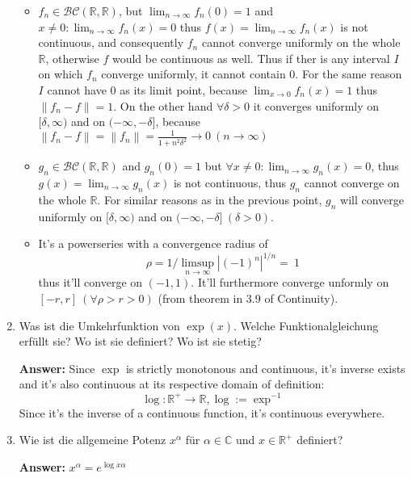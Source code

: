\documentclass[11pt]{article}
\newcommand{\norm}[1]{\left\lVert#1\right\rVert}
\newcommand{\abs}[1]{\left|#1\right|}
\begin{document}
\begin{enumerate}
\begin{itemize}
    \item $f_n \in \mathcal{BC}(\mathbb{R},\mathbb{R})$, but $\lim_{n\to\infty}f_n(0) = 1$ and $x\neq0\colon \lim_{n\to\infty}f_n(x) = 0$ thus $f(x) = \lim_{n\to\infty}f_n(x)$ is not continuous, and consequently $f_n$ cannot converge uniformly on the whole $\mathbb{R}$, otherwise $f$ would be continuous as well. Thus if ther is any interval $I$ on which $f_n$ converge uniformly, it cannot contain $0$. For the same reason $I$ cannot have $0$ as its limit point, because $\lim_{x\to0}f_n(x) = 1$ thus $\norm{f_n - f} = 1$. On the other hand $\forall \delta > 0$ it converges uniformly on  $[\delta, \infty)$ and on $(-\infty, -\delta]$, because $\norm{f_n - f} = \norm{f_n} = \frac{1}{1+n^2\delta^2} \to 0~(n\to\infty)$
    \item $g_n \in \mathcal{BC}(\mathbb{R},\mathbb{R})$ and $g_n(0) = 1$ but $\forall x\neq0\colon \lim_{n\to\infty}g_n(x) = 0$, thus $g(x) = \lim_{n\to\infty}g_n(x)$ is not continuous, thus $g_n$ cannot converge on the whole $\mathbb{R}$. For similar reasons as in the previous point, $g_n$ will converge uniformly on  $[\delta, \infty)$ and on $(-\infty, -\delta]~(\delta > 0)$.
    \item It's a powerseries with a convergence radius of $$\rho =1/\limsup_{n\to\infty}\abs{(-1)^n}^{1/n} =~1$$ thus it'll converge on $(-1, 1)$. It'll furthermore converge unformly on $[-r, r]~(\forall\rho > r > 0)$ (from theorem in 3.9 of Continuity).
\end{itemize}


\item Was ist die Umkehrfunktion von $\exp(x)$. Welche Funktionalgleichung erfüllt sie? Wo
ist sie definiert? Wo ist sie stetig?

\textbf{Answer:} Since $\exp$ is strictly monotonous and continuous, it's inverse exists and it's also continuous at its respective domain of definition: $$\log\colon \mathbb{R}^+ \to \mathbb{R}, \log := \exp^{-1}$$
Since it's the inverse of a continuous function, it's continuous everywhere.
\item Wie ist die allgemeine Potenz $x^\alpha$ für $\alpha \in \mathbb{C}$ und $x \in \mathbb{R}^+$ definiert?

\textbf{Answer:} $x^\alpha = e^{\log{x} \alpha}$

\end{enumerate}
\end{document}
